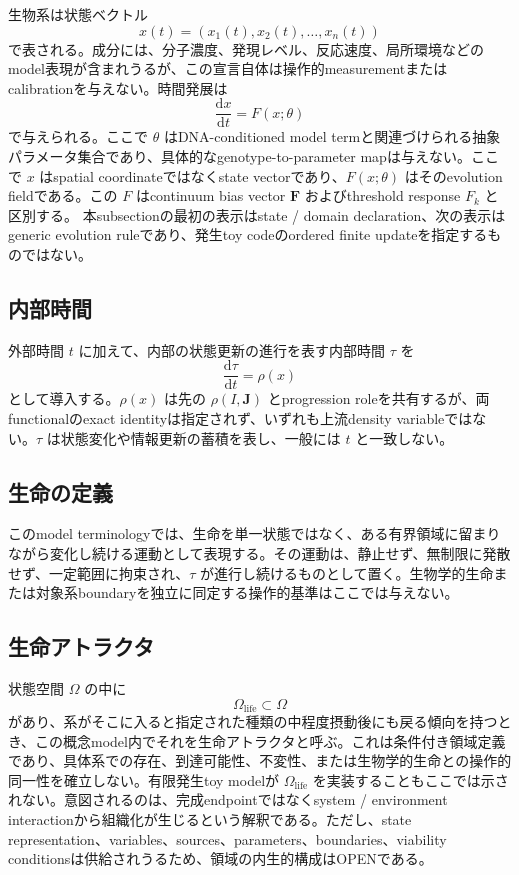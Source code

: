 \documentclass[11pt]{ltjsarticle}
\newcommand{\I}{I}
\newcommand{\J}{\mathbf{J}}
\newcommand{\dd}{\mathrm{d}}
\begin{document}
生物系は状態ベクトル
\begin{equation}
  x(t)=(x_1(t),x_2(t),\ldots,x_n(t))
\end{equation}
で表される。成分には、分子濃度、発現レベル、反応速度、局所環境などのmodel表現が含まれうるが、この宣言自体は操作的measurementまたはcalibrationを与えない。時間発展は
\begin{equation}
  \frac{\dd x}{\dd t}=F(x;\theta)
\end{equation}
で与えられる。ここで \(\theta\) はDNA-conditioned model termと関連づけられる抽象パラメータ集合であり、具体的なgenotype-to-parameter mapは与えない。ここで \(x\) はspatial coordinateではなくstate vectorであり、\(F(x;\theta)\) はそのevolution fieldである。この \(F\) はcontinuum bias vector \(\mathbf{F}\) およびthreshold response \(F_k\) と区別する。
本subsectionの最初の表示はstate / domain declaration、次の表示はgeneric evolution ruleであり、発生toy codeのordered finite updateを指定するものではない。

\subsection{内部時間}

外部時間 \(t\) に加えて、内部の状態更新の進行を表す内部時間 \(\tau\) を
\begin{equation}
  \frac{\dd\tau}{\dd t}=\rho(x)
\end{equation}
として導入する。\(\rho(x)\) は先の \(\rho(\I,\J)\) とprogression roleを共有するが、両functionalのexact identityは指定されず、いずれも上流density variableではない。\(\tau\) は状態変化や情報更新の蓄積を表し、一般には \(t\) と一致しない。

\subsection{生命の定義}

このmodel terminologyでは、生命を単一状態ではなく、ある有界領域に留まりながら変化し続ける運動として表現する。その運動は、静止せず、無制限に発散せず、一定範囲に拘束され、\(\tau\) が進行し続けるものとして置く。生物学的生命または対象系boundaryを独立に同定する操作的基準はここでは与えない。

\subsection{生命アトラクタ}

状態空間 \(\Omega\) の中に
\begin{equation}
  \Omega_{\mathrm{life}}\subset\Omega
\end{equation}
があり、系がそこに入ると指定された種類の中程度摂動後にも戻る傾向を持つとき、この概念model内でそれを生命アトラクタと呼ぶ。これは条件付き領域定義であり、具体系での存在、到達可能性、不変性、または生物学的生命との操作的同一性を確立しない。有限発生toy modelが \(\Omega_{\mathrm{life}}\) を実装することもここでは示されない。意図されるのは、完成endpointではなくsystem / environment interactionから組織化が生じるという解釈である。ただし、state representation、variables、sources、parameters、boundaries、viability conditionsは供給されうるため、領域の内生的構成はOPENである。
\end{document}
